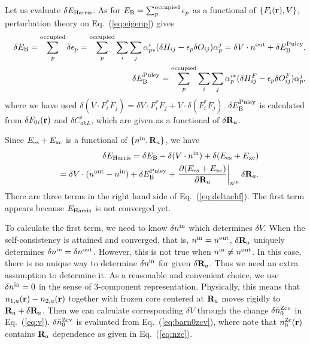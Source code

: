 \documentclass[a4paper,10pt,aip,onecolumn,amsmath,amssymb,floatfix,rmp]{revtex4-1}
\newcommand{\bfr}{{\bf r}}
\newcommand{\bfR}{{\bf R}}
\newcommand{\req}[1]{\mbox{Eq.~\!(\ref{#1})}}
\def\nzc{n^{\rm Zc}}
\def\barnzcv{\bar{n}^{\rm Zcv}}
\def\ehf{E_{\rm Harris}}
\def\nin{n^{\rm in}}
\def\nout{n^{\rm out}}
\def\Vin{V}
\begin{document}
\begin{widetext}
Let us evaluate $\delta \ehf$. 
As for $E_{\rm B}=\sum_p^{\rm occupied} \epsilon_p$ 
as a functional of $\{F_i(\bfr),\Vin\}$, perturbation theory on
\req{eq:eigenp} gives
\begin{eqnarray}
&&\delta E_{\rm B} = \sum_p^{\rm occupied} \delta \epsilon_p
=\sum_p^{\rm occupied} \sum_i \sum_j 
\alpha_{p*}^i (\delta H_{ij} -\epsilon_p \delta O_{ij}) \alpha_p^j
=\delta \Vin\cdot \nout + \delta E_{\rm B}^{\rm Puley}, \label{eq:deleb}\\
&&\delta E_{\rm B}^{\rm Puley}=\sum_p^{\rm occupied} \sum_i \sum_j 
\alpha_{p}^{i*} (\delta H^F_{ij} -\epsilon_p \delta O^F_{ij}) \alpha_p^j,
\end{eqnarray}
where we have used $\delta (\Vin\cdot F^*_i F_j)=\delta \Vin 
\cdot F^*_i F_j + \Vin\cdot \delta (F^*_i F_j)$.
$\delta E_{\rm B}^{\rm Puley}$ is calculated from 
$\delta F_{0i}(\bfr)$ and $\delta C^i_{akL}$, which 
are given as a functional of $\delta \bfR_a$.

Since $E_{\rm es} + E_{\rm xc}$ is a functional of $\{\nin,\bfR_a\}$, we have
\begin{eqnarray}
&&\delta \ehf = \delta E_{\rm B} - \delta (\Vin \cdot \nin) 
  + \delta (E_{\rm es} + E_{\rm xc}) \nonumber \\
&&= \delta \Vin \cdot (\nout- \nin) 
  + \delta E_{\rm B}^{\rm Puley} 
  + \left.\frac{\partial (E_{\rm es} + E_{\rm xc})}{\partial \bfR_a}\right|_{\nin} \delta \bfR_a.
\label{eq:deltaehf} 
\end{eqnarray}
There are three terms in the right hand side of \req{eq:deltaehf}.
The first term appears because $\ehf$ is not converged yet.

To calculate the first term, we need to know $\delta \nin$ which determines
$\delta \Vin$. When the self-consistency is attained and converged,
that is, $\nin=\nout$, $\delta \bfR_a$ uniquely determines
$\delta \nin=\delta \nout$.
However, this is not true when $\nin \ne \nout$.
In this case, there is no unique way to determine $\delta \nin$
for given $\delta \bfR_a$. Thus we need an extra assumption to
determine it. As a reasonable and convenient choice,
we use $\delta \nin=0$ in the sense of 3-component representation. 
Physically, this means that $n_{1,a}(\bfr)-n_{2,a}(\bfr)$  
together with frozen core centered at $\bfR_a$
moves rigidly to $\bfR_a+\delta\bfR_a$.
Then we can calculate corresponding $\delta \Vin$ through the change
$\delta \barnzcv_0$ in \req{eq:v}. $\delta \barnzcv_0$ is evaluated from
\req{eq:barn0zcv},
where note that $\nzc_0(\bfr)$ contains $\bfR_a$ dependence as
given in \req{eq:nzc}.



\end{widetext}
\end{document}
